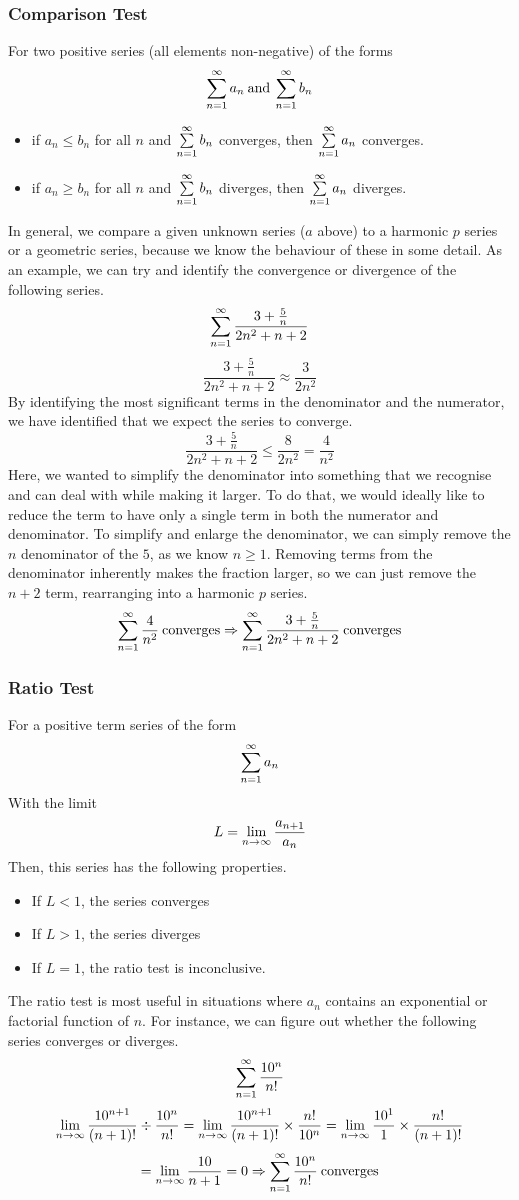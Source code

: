 \documentclass[12pt]{report}
\begin{document}
\begin{flushleft}
\subsubsection*{Comparison Test}
For two positive series (all elements non-negative) of the forms
\[\sum\limits_{n = 1}^\infty a_n \:\mathrm{and}\: \sum\limits_{n = 1}^\infty b_n\]
\begin{itemize}
    \item if \(a_n \leq b_n\) for all \(n\) and \(\sum\limits_{n = 1}^\infty b_n\) converges, 
        then \(\sum\limits_{n = 1}^\infty a_n\) converges.
    \item if \(a_n \geq b_n\) for all \(n\) and \(\sum\limits_{n = 1}^\infty b_n\) diverges,
        then \(\sum\limits_{n = 1}^\infty a_n\) diverges.
\end{itemize}
In general, we compare a given unknown series (\(a\) above) to a harmonic \(p\)
series or a geometric series, because we know the behaviour of these in some 
detail. As an example, we can try and identify the convergence or divergence
of the following series.
\[\sum\limits_{n = 1}^\infty \frac{3 + \frac{5}{n}}{2n^2 + n + 2}\]
\[\frac{3 + \frac{5}{n}}{2n^2 + n + 2} \approx \frac{3}{2n^2}\]
By identifying the most significant terms in the denominator and the numerator,
we have identified that we expect the series to converge.
\[\frac{3 + \frac{5}{n}}{2n^2 + n + 2} \leq \frac{8}{2n^2} = \frac{4}{n^2}\]
Here, we wanted to simplify the denominator into something that we recognise
and can deal with while making it larger. To do that, we would ideally like
to reduce the term to have only a single term in both the numerator and 
denominator. To simplify and enlarge the denominator, we can simply remove the
\(n\) denominator of the \(5\), as we know \(n \geq 1\). Removing terms from 
the denominator inherently makes the fraction larger, so we can just remove the
\(n + 2\) term, rearranging into a harmonic \(p\) series.
\[\sum\limits_{n = 1}^\infty \frac{4}{n^2} \:\mathrm{converges} \Rightarrow \sum\limits_{n = 1}^\infty \frac{3 + 
\frac{5}{n}}{2n^2 + n + 2} \:\mathrm{converges}\]

\subsubsection*{Ratio Test}
For a positive term series of the form
\[\sum\limits_{n = 1}^\infty a_n\]
With the limit
\[L = \lim\limits_{n\rightarrow\infty} \frac{a_{n + 1}}{a_n}\]
Then, this series has the following properties.
\begin{itemize}
    \item If \(L < 1\), the series converges
    \item If \(L > 1\), the series diverges
    \item If \(L = 1\), the ratio test is inconclusive.
\end{itemize}
The ratio test is most useful in situations where \(a_n\) contains an 
exponential or factorial function of \(n\). For instance, we can figure out
whether the following series converges or diverges.
\[\sum\limits_{n = 1}^\infty \frac{10^n}{n!}\]
\[\lim\limits_{n\rightarrow\infty} \frac{10^{n + 1}}{(n + 1)!}\div\frac{10^n}{n!} = 
\lim\limits_{n\rightarrow\infty} \frac{10^{n + 1}}{(n + 1)!}\times\frac{n!}{10^n}
= \lim\limits_{n\rightarrow\infty} \frac{10^1}{1} \times \frac{n!}{(n + 1)!}\]
\[ = \lim\limits_{n\rightarrow\infty} \frac{10}{n + 1} = 0 \Rightarrow 
\sum\limits_{n = 1}^\infty \frac{10^n}{n!}\:\mathrm{converges}\]


\end{flushleft}
\end{document}
